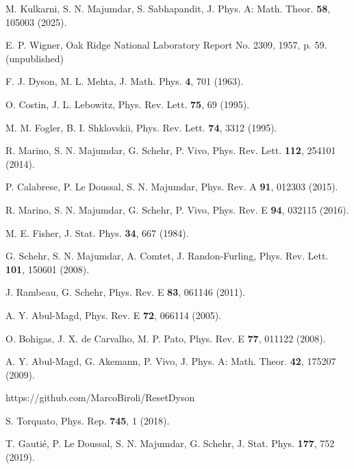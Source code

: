 \documentclass[onecolumn,superscriptaddress,
 amsmath,amssymb,
 aps,
 prd,
]{revtex4-1}
\begin{document}
\begin{thebibliography}{1}
 M. Kulkarni, S. N. Majumdar, S. Sabhapandit, J. Phys. A: Math. Theor. {\bf 58}, 105003 (2025).

E. P. Wigner, Oak Ridge National Laboratory Report No. 2309, 1957, p. 59. (unpublished)

F. J. Dyson, M. L. Mehta, J. Math. Phys. {\bf 4}, 701 (1963).

O. Costin, J. L. Lebowitz, Phys. Rev. Lett. {\bf 75}, 69 (1995).

M. M. Fogler, B. I. Shklovskii, Phys. Rev. Lett. {\bf 74}, 3312 (1995).

 R. Marino, S. N. Majumdar, G. Schehr, P. Vivo, Phys. Rev. Lett. {\bf 112}, 254101 (2014).


P. Calabrese, P. Le Doussal, S. N. Majumdar, Phys. Rev. A {\bf 91}, 012303 (2015).


R. Marino, S. N. Majumdar, G. Schehr, P. Vivo, Phys. Rev. E {\bf 94}, 032115 (2016).


M. E. Fisher, J. Stat. Phys. {\bf 34}, 667 (1984).


G. Schehr, S. N. Majumdar, A. Comtet, J. Randon-Furling, Phys. Rev. Lett. {\bf 101}, 150601 (2008).

 J. Rambeau, G. Schehr, Phys. Rev. E {\bf 83}, 061146 (2011).



 A. Y. Abul-Magd, Phys. Rev. E {\bf 72}, 066114 (2005).


 O. Bohigas, J. X. de Carvalho, M. P. Pato, Phys. Rev. E {\bf 77}, 011122 (2008).

 A. Y. Abul-Magd, G. Akemann, P. Vivo, J. Phys. A: Math. Theor. {\bf 42}, 175207 (2009).

{\color{blue}
https://github.com/MarcoBiroli/ResetDyson}

S. Torquato, Phys. Rep. {\bf 745}, 1 (2018).


T. Gauti{\'e}, P. Le Doussal, S. N. Majumdar, G. Schehr, J. Stat. Phys. {\bf 177}, 752 (2019).


\end{thebibliography}
\end{document}
